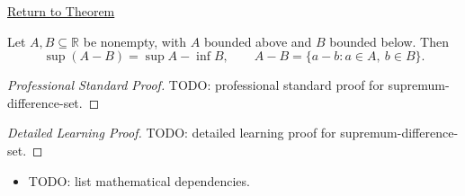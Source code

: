 \newpage
{}
\label{prf:supremum-difference-set}

\begin{remark*}[Return]
\hyperref[thm:supremum-difference-set]{Return to Theorem}
\end{remark*}

\begin{theorem*}
Let $A,B\subseteq\mathbb{R}$ be nonempty, with $A$ bounded above and $B$ bounded below. Then
\[
  \sup(A-B)=\sup A-\inf B,
  \qquad
  A-B=\{a-b:a\in A,\ b\in B\}.
\]
\end{theorem*}

\begin{proof}[Professional Standard Proof]
\LRAProofBodyStart
TODO: professional standard proof for supremum-difference-set.
\end{proof}

\begin{proof}[Detailed Learning Proof]
\LRAProofBodyStart
TODO: detailed learning proof for supremum-difference-set.
\end{proof}

\begin{remark*}
\end{remark*}

\begin{dependencies}
\begin{itemize}
  \item TODO: list mathematical dependencies.
\end{itemize}
\end{dependencies}

\clearpage

